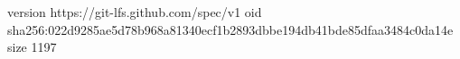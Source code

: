 version https://git-lfs.github.com/spec/v1
oid sha256:022d9285ae5d78b968a81340ecf1b2893dbbe194db41bde85dfaa3484c0da14e
size 1197
